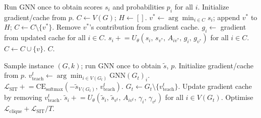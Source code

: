 \documentclass[11pt]{article}
\theoremstyle{plain}
\theoremstyle{remark}
\theoremstyle{plain}
\begin{document}
\begin{algorithm}[t]
  \caption{U-LPR: Cached-Deletion Decoder}
  \label{alg:gub}
  \begin{algorithmic}[1]
    \State Run GNN once to obtain scores $s_i$ and probabilities $p_i$ for all $i$.
    \State Initialize gradient/cache from $p$. \hfill{}
    \State $C \leftarrow V(G)$;\; $H \leftarrow []$.
    \State $v^* \leftarrow \arg\min_{i \in C} s_i$;\; append $v^*$ to $H$;\; $C \leftarrow C \setminus \{v^*\}$.
    \State Remove $v^*$'s contribution from gradient cache. \hfill{}
    \State $g_i \leftarrow$ gradient from updated cache for all $i \in C$. \hfill{}
    \State $s_i \mathrel{+}= U_\theta(s_i,\, s_{v^*},\, A_{iv^*},\, g_i,\, g_{v^*})$ for all $i \in C$. \hfill{}
    \EndWhile
     $C \leftarrow C \cup \{v\}$. \EndIf
    \EndFor
    \State \Return $C$.
  \end{algorithmic}
\end{algorithm}

\begin{algorithm}[t]
  \caption{SIT Training Step}
  \label{alg:sit_training}
  \begin{algorithmic}[1]
    \State Sample instance $(G, k)$; run GNN once to obtain $\tilde{s}$, $p$.
    \State Initialize gradient/cache from $p$. \hfill{}
    \State $v^t_{\mathrm{teach}} \leftarrow \arg\min_{i \in V(G_t)} \mathrm{GNN}(G_t)_i$. \hfill{}
    \State $\mathcal{L}_{\mathrm{SIT}} \mathrel{+}= \mathrm{CE}_{\mathrm{softmax}}(-\tilde{s}_{V(G_t)},\, v^t_{\mathrm{teach}})$. \hfill{}
    \State $G_t \leftarrow G_t \setminus \{v^t_{\mathrm{teach}}\}$.
    \State Update gradient cache by removing $v^t_{\mathrm{teach}}$. \hfill{}
    \State $\tilde{s}_i \mathrel{+}= U_\theta(\tilde{s}_i,\, \tilde{s}_{v^t},\, A_{iv^t},\, \gamma_i,\, \gamma_{v^t})$ for all $i \in V(G_t)$.
    \EndFor
    \State Optimise $\mathcal{L}_{\mathrm{clique}} + \mathcal{L}_{\mathrm{SIT}} / T$.
  \end{algorithmic}
\end{algorithm}
\end{document}
